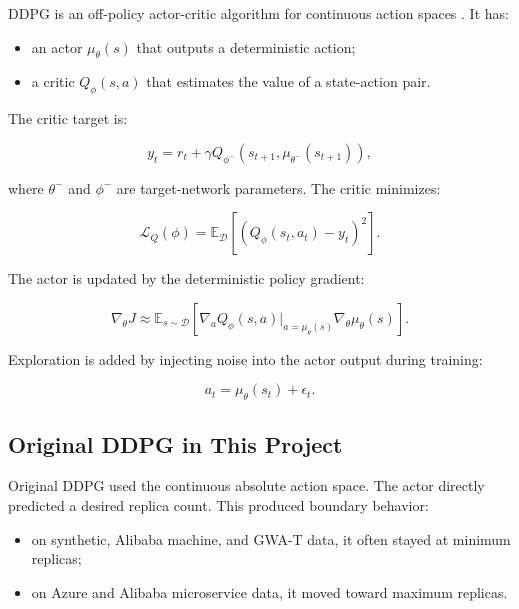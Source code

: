 \documentclass{rapportINPTCLOUD}
\begin{document}
DDPG is an off-policy actor-critic algorithm for continuous action spaces \cite{lillicrap2016}. It has:

\begin{itemize}
  \item an actor $\mu_{\theta}(s)$ that outputs a deterministic action;
  \item a critic $Q_{\phi}(s,a)$ that estimates the value of a state-action pair.
\end{itemize}

The critic target is:

\begin{equation}
y_t =
r_t
+ \gamma
Q_{\phi^-}
\left(
s_{t+1},
\mu_{\theta^-}(s_{t+1})
\right),
\end{equation}

where $\theta^-$ and $\phi^-$ are target-network parameters. The critic minimizes:

\begin{equation}
\mathcal{L}_{Q}(\phi)
=
\mathbb{E}_{\mathcal{D}}
\left[
\left(
Q_{\phi}(s_t,a_t)-y_t
\right)^2
\right].
\end{equation}

The actor is updated by the deterministic policy gradient:

\begin{equation}
\nabla_{\theta} J
\approx
\mathbb{E}_{s \sim \mathcal{D}}
\left[
\nabla_a Q_{\phi}(s,a)
\vert_{a=\mu_{\theta}(s)}
\nabla_{\theta}\mu_{\theta}(s)
\right].
\end{equation}

Exploration is added by injecting noise into the actor output during training:

\begin{equation}
a_t =
\mu_{\theta}(s_t)
+ \epsilon_t.
\end{equation}

\subsection{Original DDPG in This Project}

Original DDPG used the continuous absolute action space. The actor directly predicted a desired replica count. This produced boundary behavior:

\begin{itemize}
  \item on synthetic, Alibaba machine, and GWA-T data, it often stayed at minimum replicas;
  \item on Azure and Alibaba microservice data, it moved toward maximum replicas.
\end{itemize}
\end{document}
